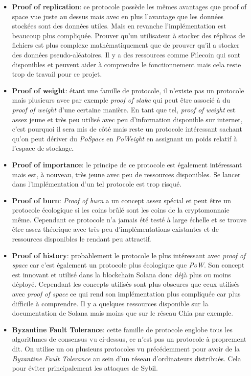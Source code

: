 \begin{itemize}
    \item \textbf{Proof of replication}: ce protocole possède les mêmes avantages que proof of space vue juste au dessus mais avec en plus l'avantage que les données stockées sont des données utiles. Mais en revanche l'implémentation est beaucoup plus compliquée. Prouver qu'un utilisateur à stocker des réplicas de fichiers est plus complexe mathématiquement que de prouver qu'il a stocker des données pseudo-aléatoires. Il y a des ressources comme Filecoin qui sont disponibles et peuvent aider à comprendre le fonctionnement mais cela reste trop de travail pour ce projet.
    \item \textbf{Proof of weight}: étant une famille de protocole, il n'existe pas un protocole mais plusieurs avec par exemple \textit{proof of stake} qui peut être associé à du \textit{proof of weight} d'une certaine manière. En tant que tel, \textit{proof of weight} est assez jeune et très peu utilisé avec peu d'information disponible sur internet, c'est pourquoi il sera mis de côté mais reste un protocole intéressant sachant qu'on peut dériver du \textit{PoSpace} en \textit{PoWeight} en assignant un poids relatif à l'espace de stockage.
    \item \textbf{Proof of importance}: le principe de ce protocole est également intéressant mais est, à nouveau, très jeune avec peu de ressources disponibles. Se lancer dans l'implémentation d'un tel protocole est trop risqué.
    \item \textbf{Proof of burn}: \textit{Proof of burn} a un concept assez spécial et peut être un protocole écologique si les coins brûlé sont les coins de la cryptomonnaie même. Cependant ce protocole n'a jamais été testé à large échelle et se trouve être assez théorique avec très peu d'implémentations existantes et de ressources disponibles le rendant peu attractif.
    \item \textbf{Proof of history}: probablement le protocole le plus intéressant avec \textit{proof of space} car c'est également un protocole plus écologique que \textit{PoW}. Son concept est innovant et utilisé dans la blockchain Solana donc déjà plus ou moins déployé. Cependant les concepts utilisés sont plus obscures que ceux utilisés avec \textit{proof of space} ce qui rend son implémentation plus compliquée car plus difficile à comprendre. Il y a quelques ressources disponible sur la documentation de Solana mais moins que sur le réseau Chia par exemple.
    \item \textbf{Byzantine Fault Tolerance}: cette famille de protocole englobe tous les algorithmes de consensus vu ci-dessus, ce n'est pas un protocole à proprement dit. On utilise un ou plusieurs protocoles vu précédemment pour avoir de la \textit{Byzantine Fault Tolerance} au sein d'un réseau d'ordinateurs distribués. Cela pour éviter principalement les attaques de Sybil.
\end{itemize}

